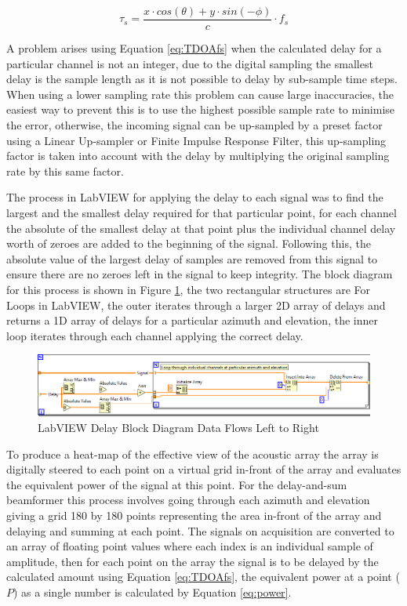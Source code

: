 \documentclass{UoNMCHA}
\numberwithin{equation}{section}
\begin{document}
    \begin{equation}
        \tau_s = \frac{x \cdot cos(\theta) + y \cdot sin(-\phi)}{c}\cdot f_s
        \label{eq:TDOAfs}
    \end{equation}
    
    A problem arises using Equation \ref{eq:TDOAfs} when the calculated delay for a particular channel is not an integer, due to the digital sampling the smallest delay is the sample length as it is not possible to delay by sub-sample time steps. When using a lower sampling rate this problem can cause large inaccuracies, the easiest way to prevent this is to use the highest possible sample rate to minimise the error, otherwise, the incoming signal can be up-sampled by a preset factor using a Linear Up-sampler or Finite Impulse Response Filter, this up-sampling factor is taken into account with the delay by multiplying the original sampling rate by this same factor. 
    
    The process in LabVIEW for applying the delay to each signal was to find the largest and the smallest delay required for that particular point, for each channel the absolute of the smallest delay at that point plus the individual channel delay worth of zeroes are added to the beginning of the signal. Following this, the absolute value of the largest delay of samples are removed from this signal to ensure there are no zeroes left in the signal to keep integrity. The block diagram for this process is shown in Figure \ref{fig:DelayLabVIEW}, the two rectangular structures are For Loops in LabVIEW, the outer iterates through a larger 2D array of delays and returns a 1D array of delays for a particular azimuth and elevation, the inner loop iterates through each channel applying the correct delay.
    
    \begin{figure} [H]
        \centering
        \includegraphics[keepaspectratio, width = \textwidth]{Figures/DelayBlockDiagram.png}
        \caption{LabVIEW Delay Block Diagram Data Flows Left to Right}
        \label{fig:DelayLabVIEW}
    \end{figure}
    
    To produce a heat-map of the effective view of the acoustic array the array is digitally steered to each point on a virtual grid in-front of the array and evaluates the equivalent power of the signal at this point. For the delay-and-sum beamformer this process involves going through each azimuth and elevation giving a grid 180 by 180 points representing the area in-front of the array and delaying and summing at each point. The signals on acquisition are converted to an array of floating point values where each index is an individual sample of amplitude, then for each point on the array the signal is to be delayed by the calculated amount using Equation \ref{eq:TDOAfs}, the equivalent power at a point ($P$) as a single number is calculated by Equation \ref{eq:power}.
   
\end{document}
